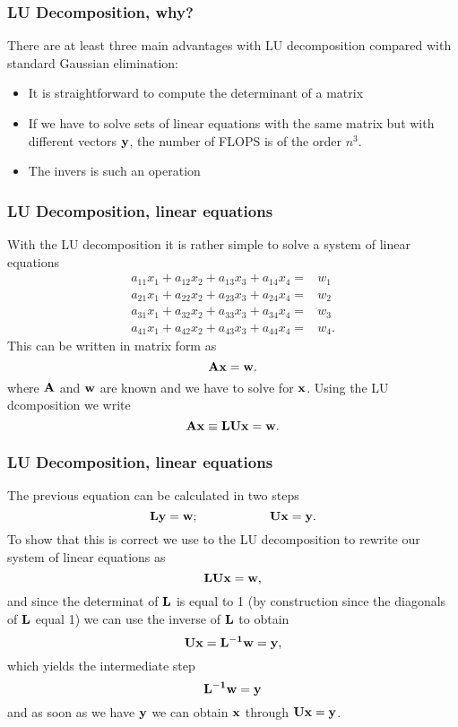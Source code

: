 \documentclass[compress]{beamer}
\begin{document}
\frame
{
  \frametitle{LU Decomposition, why?}
\begin{small}
{\scriptsize
There are at least three main advantages with LU decomposition compared with standard Gaussian elimination:
\begin{itemize}
\item It is straightforward to compute the determinant of a matrix
\item If we have to solve sets of linear equations with the same matrix but with different vectors ${\bf y}$,
the number of FLOPS is of the order $n^3$.
\item The invers is such an operation
\end{itemize}
}
\end{small}
}


\frame
{
  \frametitle{LU Decomposition, linear equations}
\begin{small}
{\scriptsize
With the LU decomposition it is rather
simple to solve a system of linear equations
%
\begin{eqnarray}
 a_{11}x_1 +a_{12}x_2 +a_{13}x_3 + a_{14}x_4=&w_1 \nonumber \\
a_{21}x_1 + a_{22}x_2 + a_{23}x_3 + a_{24}x_4=&w_2 \nonumber \\
a_{31}x_1 + a_{32}x_2 + a_{33}x_3 + a_{34}x_4=&w_3 \nonumber \\
a_{41}x_1 + a_{42}x_2 + a_{43}x_3 + a_{44}x_4=&w_4. \nonumber
\end{eqnarray}
%
This can be written in matrix form as
\[
   {\bf Ax}={\bf w}.
\]
%
where ${\bf A}$ and ${\bf w}$ are known and we have to solve for
${\bf x}$. Using the LU dcomposition we write
%
\[
   {\bf A} {\bf x} \equiv {\bf L} {\bf U} {\bf x} ={\bf w}.
\]

}
\end{small}
}


\frame
{
  \frametitle{LU Decomposition, linear equations}
\begin{small}
{\scriptsize
The previous equation can be calculated in two steps
%
\[
  {\bf L} {\bf y} = {\bf w}; \hspace*{2cm} {\bf Ux}={\bf y}.
  \label{eq:byw}
\]
%
To show that this is correct we use to the LU decomposition
to rewrite our system of linear equations as
\[
   {\bf LUx}={\bf w},
\]
and since the determinat of ${\bf L}$ is equal to 1 (by construction
since the diagonals of ${\bf L}$ equal 1) we can use the inverse of
${\bf L}$ to obtain
\[
   {\bf Ux}={\bf L^{-1}w}={\bf y},
\]
which yields the intermediate step
\[
   {\bf L^{-1}w}={\bf y}
\]
and as soon as we have ${\bf y}$ we can obtain ${\bf x}$
through ${\bf Ux}={\bf y}$.
}
\end{small}
}
\end{document}
